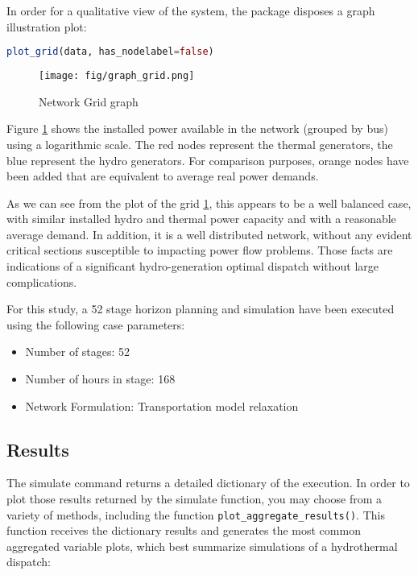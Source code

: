 \documentclass{juliacon}
\begin{document}
In order for a qualitative view of the system, the package disposes a graph illustration plot:

\begin{lstlisting}[language = Julia]
plot_grid(data, has_nodelabel=false)
\end{lstlisting}

\begin{figure}[htb]
\centerline{\texttt{[image: fig/graph\_grid.png]}}
\caption{Network Grid graph}
\label{fig:graph_grid}
\end{figure}

Figure \ref{fig:graph_grid} shows the installed power available in the network (grouped by bus) using a logarithmic scale. The red nodes represent the thermal generators, the blue represent the hydro generators. For comparison purposes, orange nodes have been added that are equivalent to average real power demands.

As we can see from the plot of the grid \ref{fig:graph_grid}, this appears to be a well balanced case, with similar installed hydro and thermal power capacity and with a reasonable average demand. In addition, it is a well distributed network, without any evident critical sections susceptible to impacting power flow problems. Those facts are indications of a significant hydro-generation optimal dispatch without large complications.

For this study, a 52 stage horizon planning and simulation have been executed using the following case parameters:

\begin{itemize}
    \item Number of stages: 52
    \item Number of hours in stage: 168 
    \item Network Formulation: Transportation model relaxation
\end{itemize}

\subsection{Results} %

The simulate command returns a detailed dictionary of the execution. In order to plot those results returned by the simulate function, you may choose from a variety of methods, including the function \texttt{plot\_aggregate\_results()}. This function receives the dictionary results and generates the most common aggregated variable plots, which best summarize simulations of a hydrothermal dispatch:
\end{document}
